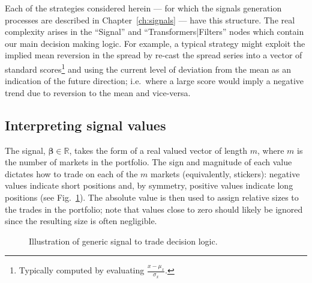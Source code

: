 Each of the strategies considered herein --- for which the signals generation
processes are described in Chapter~\ref{ch:signals} --- have this structure.
The real complexity arises in the ``Signal'' and ``Transformers|Filters'' nodes
which contain our main decision making logic. For example, a typical strategy
might exploit the implied mean reversion in the spread by re-cast the spread
series into a vector of standard scores\footnote{Typically computed by
evaluating $\frac{x - \mu_x}{\sigma_x}$.} and using the current level of
deviation from the mean as an indication of the future direction; i.e.\ where a
large score would imply a negative trend due to reversion to the mean and
vice-versa.


\subsection{Interpreting signal values}
The signal, $\bm{\beta} \in \mathbb{R}$, takes the form of a real valued vector
of length $m$, where $m$ is the number of markets in the portfolio. The sign
and magnitude of each value dictates how to trade on each of the $m$ markets
(equivalently, stickers): negative values indicate short positions and, by
symmetry, positive values indicate long positions (see
Fig.~\ref{fig:signal2trade}). The absolute value is then used to assign
relative sizes to the trades in the portfolio; note that values close to zero
should likely be ignored since the resulting size is often negligible.

\begin{figure}
    \centering

    \caption{Illustration of generic signal to trade decision
    logic.}\label{fig:signal2trade}
\end{figure}


